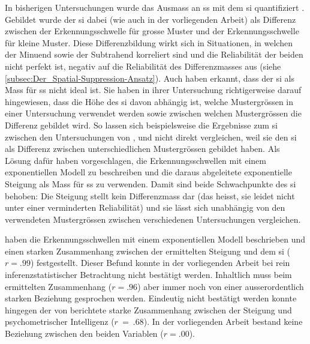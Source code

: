 \documentclass[11pt, twoside, a4paper]{book}		%
\begin{document}
In bisherigen Untersuchungen wurde das Ausmass an \gls{ss} mit dem \gls{si} quantifiziert \citep{Lappin2009, Melnick2013, Tadin2006, Tadin2011}. Gebildet wurde der \gls{si} dabei (wie auch in der vorliegenden Arbeit) als Differenz zwischen der Erkennungsschwelle für grosse Muster und der Erkennungsschwelle für kleine Muster. Diese Differenzbildung wirkt sich in Situationen, in welchen der Minuend sowie der Subtrahend korreliert sind und die Reliabilität der beiden nicht perfekt ist, negativ auf die Reliabilität des Differenzmasses aus (siehe \autoref{subsec:Der_Spatial-Suppression-Ansatz}).
Auch \citet{Melnick2013} haben erkannt, dass der \gls{si} als Mass für \gls{ss} nicht ideal ist. Sie haben in ihrer Untersuchung richtigerweise darauf hingewiesen, dass die Höhe des \gls{si} davon abhängig ist, welche Mustergrössen in einer Untersuchung verwendet werden sowie zwischen welchen Mustergrössen die Differenz gebildet wird. So lassen sich beispielsweise die Ergebnisse zum \gls{si} zwischen den Untersuchungen von \citet{Tadin2006}, \citet{Tadin2011} und \citeauthor{Melnick2013} nicht direkt vergleichen, weil sie den \gls{si} als Differenz zwischen unterschiedlichen Mustergrössen gebildet haben. Als Lösung dafür haben \citeauthor{Melnick2013} vorgeschlagen, die Erkennungsschwellen mit einem exponentiellen Modell zu beschreiben und die daraus abgeleitete exponentielle Steigung als Mass für \gls{ss} zu verwenden. Damit sind beide Schwachpunkte des \gls{si} behoben: Die Steigung stellt kein Differenzmass dar (das heisst, sie leidet nicht unter einer verminderten Reliabilität) und sie lässt sich unabhängig von den verwendeten Mustergrössen zwischen verschiedenen Untersuchungen vergleichen.

\citet{Melnick2013} haben die Erkennungsschwellen mit einem exponentiellen Modell beschrieben und einen starken Zusammenhang zwischen der ermittelten Steigung und dem \gls{si} ($r=.99$) festgestellt. Dieser Befund konnte in der vorliegenden Arbeit bei rein inferenzstatistischer Betrachtung nicht bestätigt werden. Inhaltlich muss beim ermittelten Zusammenhang ($r=.96$) aber immer noch von einer ausserordentlich starken Beziehung gesprochen werden.
Eindeutig nicht bestätigt werden konnte hingegen der von \citeauthor{Melnick2013} berichtete starke Zusammenhang zwischen der Steigung und psychometrischer Intelligenz ($r~=~.68$). In der vorliegenden Arbeit bestand keine Beziehung zwischen den beiden Variablen ($r=.00$).
\end{document}
